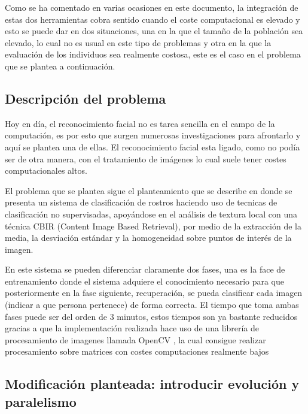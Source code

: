 Como se ha comentado en varias ocasiones en este documento, la integración de estas dos herramientas cobra sentido cuando el coste computacional es elevado y esto se puede dar en dos situaciones, una en la que el tama\~no de la población sea elevado, lo cual no es usual en este tipo de problemas y otra en la que la evaluación de los individuos sea realmente costosa, este es el caso en el problema que se plantea a continuación.

\subsection{Descripci\'on del problema}

Hoy en d\'ia, el reconocimiento facial no es tarea sencilla en el campo de la computación, es por esto que surgen numerosas investigaciones para afrontarlo y aquí se plantea una de ellas. El reconocimiento facial esta ligado, como no podía ser de otra manera, con el tratamiento de imágenes lo cual suele tener costes computacionales altos.

El problema que se plantea sigue el planteamiento que se describe en \cite{paper-facerecognition} donde se presenta un sistema de clasificación de rostros haciendo uso de tecnicas de clasificaci\'on no supervisadas, apoy\'andose en el an\'alisis de textura local con una t\'ecnica CBIR (Content Image Based Retrieval), por medio de la extracci\'on de la media, la desviaci\'on est\'andar y la homogeneidad sobre puntos de inter\'es de la imagen.


En este sistema se pueden diferenciar claramente dos fases, una es la face de entrenamiento  donde el sistema adquiere el conocimiento necesario para que posteriormente en la fase siguiente, recuperación, se pueda clasificar cada imagen (indicar a que persona pertenece) de forma correcta. El tiempo que toma ambas fases puede ser del orden de 3 minutos, estos tiempos son ya bastante reducidos gracias a que la implementaci\'on realizada hace uso de una librería de procesamiento de imagenes llamada OpenCV \cite{opencv}, la cual consigue realizar procesamiento sobre matrices con costes computaciones realmente bajos

\subsection{Modificación planteada: introducir evolución y paralelismo}

